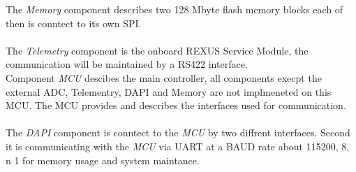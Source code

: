 The \textit{Memory} component  describes two 128 Mbyte flash memory blocks each of then  is conntect to its own SPI. \\ \\
The \textit{Telemetry} component is the onboard REXUS Service Module, the communication will be maintained by a RS422 interface. \\ 
Component \textit{MCU} descibes the main controller, all components execpt the external ADC, Telementry, DAPI and Memory are not implmeneted on this MCU. The MCU provides and describes the interfaces used for communication. \\ \\
The \textit{DAPI} component is conntect to the \textit{MCU} by two diffrent interfaces. Second it is communicating with the \textit{MCU} via UART at a BAUD rate about 115200, 8, n 1 for memory usage and system maintance. 